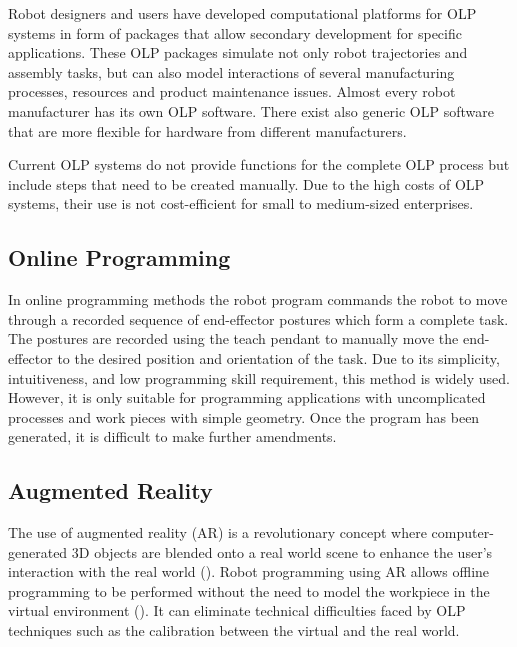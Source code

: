 Robot designers and users have developed computational platforms for OLP systems in form of packages that allow secondary development for specific applications. 
These OLP packages simulate not only robot trajectories and assembly tasks, but can also model interactions of several manufacturing processes, resources and product maintenance issues. 
Almost every robot manufacturer has its own OLP software. 
There exist also generic OLP software that are more flexible for hardware from different manufacturers.

Current OLP systems do not provide functions for the complete OLP process but include steps that need to be created manually. 
Due to the high costs of OLP systems, their use is not cost-efficient for small to medium-sized enterprises.

\subsection{Online Programming}\label{sssec:Online Programming}
In online programming methods the robot program commands the robot to move through a recorded sequence of end-effector postures which form a complete task. 
The postures are recorded using the teach pendant to manually move the end-effector to the desired position and orientation of the task. 
Due to its simplicity, intuitiveness, and low programming skill requirement, this method is widely used. 
However, it is only suitable for programming applications with uncomplicated processes and work pieces with simple geometry. 
Once the program has been generated, it is difficult to make further amendments.

\subsection{Augmented Reality}\label{sssec:Augmented Reality}
The use of augmented reality (AR) is a revolutionary concept where computer-generated 3D objects are blended onto a real world scene to enhance the user's interaction with the real world (\cite{pettersen2003augmented}). 
Robot programming using AR allows offline programming to be performed without the need to model the workpiece in the virtual environment (\cite{pan2012recent}). 
It can eliminate technical difficulties faced by OLP techniques such as the calibration between the virtual and the real world.
